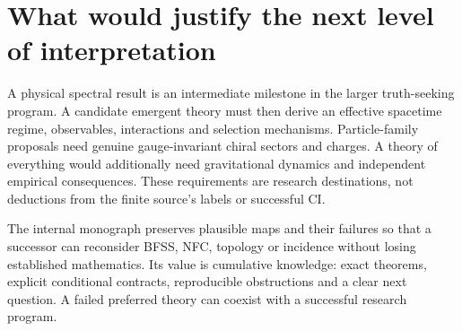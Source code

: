 
\section{What would justify the next level of interpretation}
\label{sec:ed08-why}
A physical spectral result is an intermediate milestone in the
larger truth-seeking program. A candidate emergent theory must then
derive an effective spacetime regime, observables, interactions and
selection mechanisms. Particle-family proposals need genuine
gauge-invariant chiral sectors and charges. A theory of everything
would additionally need gravitational dynamics and independent
empirical consequences. These requirements are research destinations,
not deductions from the finite source's labels or successful CI.

The internal monograph preserves plausible maps and their failures
so that a successor can reconsider BFSS, NFC, topology or incidence
without losing established mathematics. Its value is cumulative
knowledge: exact theorems, explicit conditional contracts, reproducible
obstructions and a clear next question. A failed preferred theory
can coexist with a successful research program.
